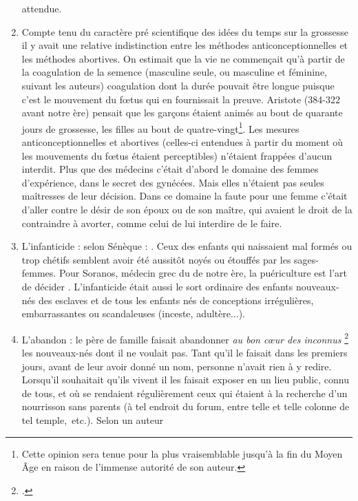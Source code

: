 \begin{enumerate}
attendue.
\item Compte tenu du caractère pré scientifique des idées du temps
sur la grossesse il y avait une relative indistinction entre les méthodes anticonceptionnelles
et les méthodes abortives. On estimait que la vie ne
commençait qu'à partir de la coagulation de la semence (masculine seule,
ou masculine et féminine, suivant les auteurs) coagulation dont la durée
pouvait être longue puisque c'est le mouvement du fœtus qui en fournissait
la preuve. Aristote (384-322 avant notre ère) pensait que les garçons
étaient animés au bout de quarante jours de grossesse, les filles au bout
de quatre-vingt\footnote{Cette opinion sera tenue pour la plus vraisemblable jusqu'à
la fin du Moyen Âge en raison de l'immense autorité de son auteur.}.
Les mesures anticonceptionnelles et abortives (celles-ci entendues à partir du
moment où les mouvements du fœtus étaient perceptibles) n'étaient
frappées d'aucun interdit. Plus que des médecins c'était d'abord le domaine
des femmes d'expérience, dans le secret des gynécées. Mais elles n'étaient pas seules maîtresses de leur décision. Dans ce
domaine la faute pour une femme c'était d'aller contre le désir de son
époux ou de son maître, qui avaient le droit de la contraindre à avorter,
comme celui de lui interdire de le faire.
\item L'infanticide : selon Sénèque : . Ceux des enfants qui naissaient mal formés ou
trop chétifs semblent avoir été aussitôt noyés ou étouffés par les sages-femmes. 
Pour \hbox{Soranos}, médecin grec du
 de notre ère, la puériculture est l'art de décider . L'infanticide était aussi le sort ordinaire
des enfants nouveaux-nés des esclaves et de tous les enfants nés de conceptions
irrégulières, embarrassantes ou scandaleuses (inceste, adultère...).
\item L'abandon : le père de famille faisait abandonner {\emph{au bon cœur
des inconnus}%
\footcite{Boswell1993}%
} les nouveaux-nés dont il ne voulait pas. Tant qu'il le faisait
dans les premiers jours, avant de leur avoir donné un nom, personne
n'avait rien à y redire. Lorsqu'il souhaitait qu'ils vivent il les faisait exposer
en un lieu public, connu de tous, et où se rendaient régulièrement
ceux qui étaient à la recherche d'un nourrisson sans parents (à tel endroit
du forum, entre telle et telle colonne de tel temple,~etc.). Selon un auteur

\end{enumerate}
